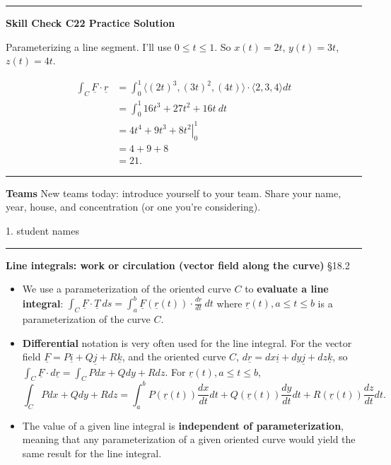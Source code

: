 \documentclass[12pt,letterpaper,noanswers]{exam}
\newcommand{\mb}[1]{\underline{#1}}
\begin{document}
\vspace{0.2cm}
\hrule
\vspace{0.2cm}


\noindent\textbf{Skill Check C22 Practice Solution}
\begin{questions}
\question 
 Parameterizing a line segment.  I'll use $0\leq t \leq 1$.  So $x(t) = 2t$, $y(t) = 3t$, $z(t) = 4t$.

\begin{align*}
\int_C \mb F \cdot \mb r &= \int_0^1 \langle (2t)^3, (3t)^2, (4t)\rangle \cdot \langle 2,3,4\rangle dt \\
&= \int_0^1 16t^3 + 27t^2 + 16t\ dt \\
& = \left. 4t^4 + 9t^3 + 8t^2 \right\vert_0^1 \\
& = 4 + 9 + 8 \\
&= 21.
\end{align*}

\end{questions}

\vspace{0.2cm}
\hrule
\vspace{0.2cm}

\noindent\textbf{Teams}
New teams today: introduce yourself to your team.  Share your name, year, house, and concentration (or one you're considering).

\begin{multicols}{2}

1.  student names
\end{multicols}


\vspace{0.2cm}
\hrule
\vspace{0.2cm}



\eject



\noindent\textbf{Line integrals: work or circulation (vector field along the curve)} \S 18.2
\begin{tcolorbox}
\begin{itemize}
\itemsep0em
    \item We use a parameterization of the oriented curve $C$ to \textbf{evaluate a line integral}: $\int_C \mb F \cdot \mb T\ ds = \int_a^b \mb F(\mb r(t))\cdot \frac{d\mb r}{dt}\ dt$ where $\mb r(t), a \leq t\leq b$ is a parameterization of the curve $C$.
    \item \textbf{Differential} notation is very often used for the line integral.  For the vector field $\mb F = P\mb i + Q\mb j + R\mb k$, and the oriented curve $C$, $d\mb r = dx\mb i + dy\mb j + dz\mb k$, so $\displaystyle\int_C \mb F\cdot d\mb r = \int_C Pdx + Qdy + Rdz$.  For $\mb r(t), a\leq t\leq b$, \[\int_C Pdx + Qdy + Rdz = \int_a^b P(\mb r(t))\frac{dx}{dt}dt +Q(\mb r(t))\frac{dy}{dt}dt + R(\mb r(t))\frac{dz}{dt}dt.\]
    \item The value of a given line integral is \textbf{independent of parameterization}, meaning that any parameterization of a given oriented curve would yield the same result for the line integral.
\end{itemize}




\end{tcolorbox}
\end{document}
